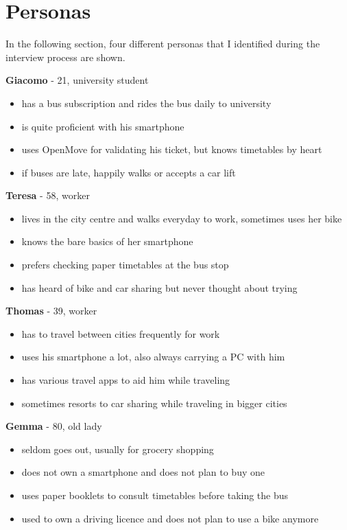 \documentclass[11pt]{article}
\begin{document}
\section{Personas}
In the following section, four different personas that I identified during the interview process are shown.
\par
\textbf{Giacomo} - 21, university student
\begin{itemize}
    \item has a bus subscription and rides the bus daily to university
    \item is quite proficient with his smartphone
    \item uses OpenMove for validating his ticket, but knows timetables by heart
    \item if buses are late, happily walks or accepts a car lift
\end{itemize}
\par
\textbf{Teresa} - 58, worker
\begin{itemize}
    \item lives in the city centre and walks everyday to work, sometimes uses her bike
    \item knows the bare basics of her smartphone
    \item prefers checking paper timetables at the bus stop
    \item has heard of bike and car sharing but never thought about trying
\end{itemize}
\par
\textbf{Thomas} - 39, worker
\begin{itemize}
    \item has to travel between cities frequently for work
    \item uses his smartphone a lot, also always carrying a PC with him
    \item has various travel apps to aid him while traveling
    \item sometimes resorts to car sharing while traveling in bigger cities
\end{itemize}
\par
\textbf{Gemma} - 80, old lady
\begin{itemize}
    \item seldom goes out, usually for grocery shopping
    \item does not own a smartphone and does not plan to buy one
    \item uses paper booklets to consult timetables before taking the bus
    \item used to own a driving licence and does not plan to use a bike anymore
\end{itemize}
\end{document}
